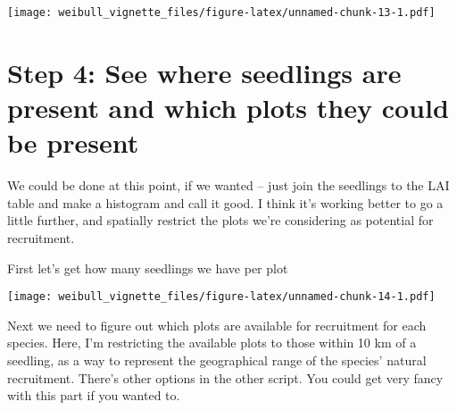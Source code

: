 \documentclass[
]{article}
\newenvironment{Shaded}{\begin{snugshade}}{\end{snugshade}}
\newcommand{\AttributeTok}[1]{\textcolor[rgb]{0.13,0.29,0.53}{#1}}
\newcommand{\CommentTok}[1]{\textcolor[rgb]{0.56,0.35,0.01}{\textit{#1}}}
\newcommand{\DecValTok}[1]{\textcolor[rgb]{0.00,0.00,0.81}{#1}}
\newcommand{\FunctionTok}[1]{\textcolor[rgb]{0.13,0.29,0.53}{\textbf{#1}}}
\newcommand{\NormalTok}[1]{#1}
\newcommand{\OtherTok}[1]{\textcolor[rgb]{0.56,0.35,0.01}{#1}}
\newcommand{\SpecialCharTok}[1]{\textcolor[rgb]{0.81,0.36,0.00}{\textbf{#1}}}
\newcommand{\StringTok}[1]{\textcolor[rgb]{0.31,0.60,0.02}{#1}}
\begin{document}
\texttt{[image: weibull\_vignette\_files/figure-latex/unnamed-chunk-13-1.pdf]}

\section{Step 4: See where seedlings are present and which plots they
could be
present}\label{step-4-see-where-seedlings-are-present-and-which-plots-they-could-be-present}

We could be done at this point, if we wanted -- just join the seedlings
to the LAI table and make a histogram and call it good. I think it's
working better to go a little further, and spatially restrict the plots
we're considering as potential for recruitment.

First let's get how many seedlings we have per plot

\begin{Shaded}
\end{Shaded}

\texttt{[image: weibull\_vignette\_files/figure-latex/unnamed-chunk-14-1.pdf]}

Next we need to figure out which plots are available for recruitment for
each species. Here, I'm restricting the available plots to those within
10 km of a seedling, as a way to represent the geographical range of the
species' natural recruitment. There's other options in the other script.
You could get very fancy with this part if you wanted to.
\end{document}
